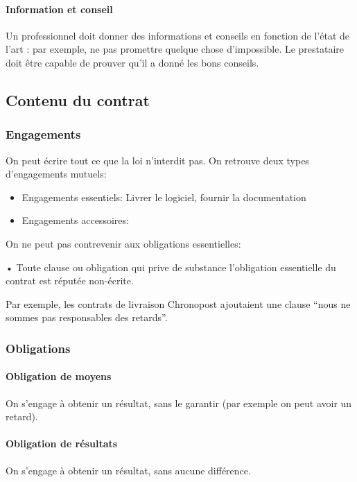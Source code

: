 \documentclass[10pt,a4paper,french]{article}
\begin{document}
\paragraph{Information et conseil}
Un professionnel doit donner des informations et conseils en fonction de l'état de l'art : par exemple, ne pas promettre quelque chose d'impossible. Le prestataire doit être capable de prouver qu'il a donné les bons conseils.

\subsection{Contenu du contrat}

\subsubsection{Engagements}
On peut écrire tout ce que la loi n'interdit pas. On retrouve deux types d'engagements mutuels:
\begin{itemize}
\item Engagements essentiels: Livrer le logiciel, fournir la documentation
\item Engagements accessoires: 
\end{itemize}

On ne peut pas contrevenir aux obligations essentielles:

\begin{cquote}{•}
Toute clause ou obligation qui prive de substance l'obligation essentielle du contrat est réputée non-écrite.
\end{cquote}
Par exemple, les contrats de livraison Chronopost ajoutaient une clause ``nous ne sommes pas responsables des retards''.

\subsubsection{Obligations}
\paragraph{Obligation de moyens}
On s'engage à obtenir un résultat, sans le garantir (par exemple on peut avoir un retard).

\paragraph{Obligation de résultats}
On s'engage à obtenir un résultat, sans aucune différence.
\end{document}
